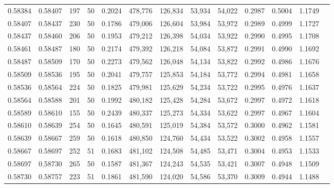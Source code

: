 \begin{tabular}{rrrrrrrrrrrrr}
0.58384 & 0.58407 &   197 &  50 &                                     0.2024 & 478,776 & 126,834 &  53,934 &  54,022 & 0.2987 & 0.5004 & 1.1749 \\
0.58407 & 0.58437 &   230 &  50 &                                     0.1786 & 479,006 & 126,604 &  53,984 &  53,972 & 0.2989 & 0.4999 & 1.1727 \\
0.58437 & 0.58460 &   206 &  50 &                                     0.1953 & 479,212 & 126,398 &  54,034 &  53,922 & 0.2990 & 0.4995 & 1.1708 \\
0.58461 & 0.58487 &   180 &  50 &                                     0.2174 & 479,392 & 126,218 &  54,084 &  53,872 & 0.2991 & 0.4990 & 1.1692 \\
0.58487 & 0.58509 &   170 &  50 &                                     0.2273 & 479,562 & 126,048 &  54,134 &  53,822 & 0.2992 & 0.4986 & 1.1676 \\
0.58509 & 0.58536 &   195 &  50 &                                     0.2041 & 479,757 & 125,853 &  54,184 &  53,772 & 0.2994 & 0.4981 & 1.1658 \\
0.58536 & 0.58564 &   224 &  50 &                                     0.1825 & 479,981 & 125,629 &  54,234 &  53,722 & 0.2995 & 0.4976 & 1.1637 \\
0.58564 & 0.58588 &   201 &  50 &                                     0.1992 & 480,182 & 125,428 &  54,284 &  53,672 & 0.2997 & 0.4972 & 1.1618 \\
0.58589 & 0.58610 &   155 &  50 &                                     0.2439 & 480,337 & 125,273 &  54,334 &  53,622 & 0.2997 & 0.4967 & 1.1604 \\
0.58610 & 0.58639 &   254 &  50 &                                     0.1645 & 480,591 & 125,019 &  54,384 &  53,572 & 0.3000 & 0.4962 & 1.1581 \\
0.58639 & 0.58667 &   259 &  50 &                                     0.1618 & 480,850 & 124,760 &  54,434 &  53,522 & 0.3002 & 0.4958 & 1.1557 \\
0.58667 & 0.58697 &   252 &  51 &                                     0.1683 & 481,102 & 124,508 &  54,485 &  53,471 & 0.3004 & 0.4953 & 1.1533 \\
0.58697 & 0.58730 &   265 &  50 &                                     0.1587 & 481,367 & 124,243 &  54,535 &  53,421 & 0.3007 & 0.4948 & 1.1509 \\
0.58730 & 0.58757 &   223 &  51 &                                     0.1861 & 481,590 & 124,020 &  54,586 &  53,370 & 0.3009 & 0.4944 & 1.1488 \\

\end{tabular}
